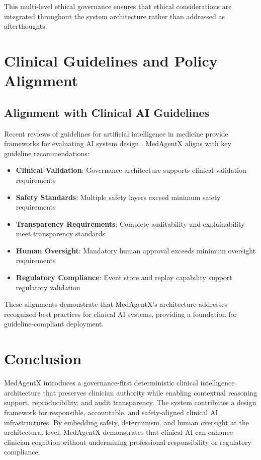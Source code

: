\documentclass[journal]{IEEEtran}
\begin{document}
This multi-level ethical governance ensures that ethical considerations are integrated throughout the system architecture rather than addressed as afterthoughts.

\newpage
\section{Clinical Guidelines and Policy Alignment}

\subsection{Alignment with Clinical AI Guidelines}
Recent reviews of guidelines for artificial intelligence in medicine provide frameworks for evaluating AI system design \cite{guidelines_ai_medicine_2023}. MedAgentX aligns with key guideline recommendations:

\begin{itemize}
    \item \textbf{Clinical Validation}: Governance architecture supports clinical validation requirements
    \item \textbf{Safety Standards}: Multiple safety layers exceed minimum safety requirements
    \item \textbf{Transparency Requirements}: Complete auditability and explainability meet transparency standards
    \item \textbf{Human Oversight}: Mandatory human approval exceeds minimum oversight requirements
    \item \textbf{Regulatory Compliance}: Event store and replay capability support regulatory validation
\end{itemize}

These alignments demonstrate that MedAgentX's architecture addresses recognized best practices for clinical AI systems, providing a foundation for guideline-compliant deployment.

\newpage
\section{Conclusion}
MedAgentX introduces a governance-first deterministic clinical intelligence architecture that preserves clinician authority while enabling contextual reasoning support, reproducibility, and audit transparency. The system contributes a design framework for responsible, accountable, and safety-aligned clinical AI infrastructures. By embedding safety, determinism, and human oversight at the architectural level, MedAgentX demonstrates that clinical AI can enhance clinician cognition without undermining professional responsibility or regulatory compliance.
\end{document}
